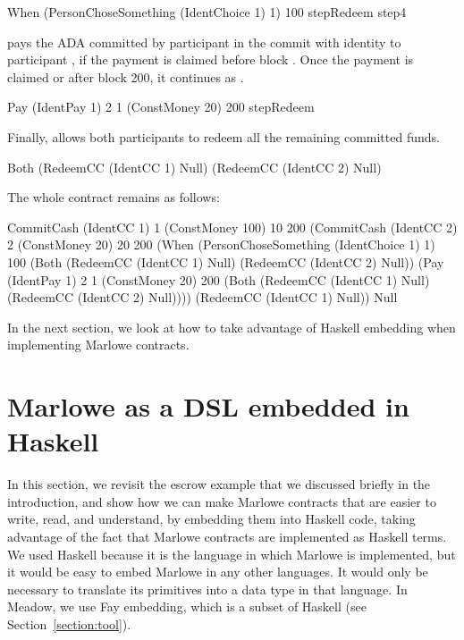 \documentclass[runningheads]{llncs}
\begin{document}
\begin{haskellcode}
When (PersonChoseSomething (IdentChoice 1) 1) 100
     stepRedeem
     step4
\end{haskellcode}

 pays the  ADA committed by participant  in the commit with 
identity  to participant , if the payment is claimed before block 
. Once the payment is claimed or after block 200, it continues as .

\begin{haskellcode}
Pay (IdentPay 1) 2 1 (ConstMoney 20) 200 stepRedeem
\end{haskellcode}

Finally,  allows both participants to redeem all the remaining committed funds.

\begin{haskellcode}
Both (RedeemCC (IdentCC 1) Null)
     (RedeemCC (IdentCC 2) Null)
\end{haskellcode}

The whole contract remains as follows:
\begin{haskellcode}
CommitCash (IdentCC 1) 1
           (ConstMoney 100)
           10 200
           (CommitCash (IdentCC 2) 2
                       (ConstMoney 20)
                       20 200
                       (When (PersonChoseSomething (IdentChoice 1) 1)
                             100
                             (Both (RedeemCC (IdentCC 1) Null)
                                   (RedeemCC (IdentCC 2) Null))
                             (Pay (IdentPay 1) 2 1
                                  (ConstMoney 20)
                                  200
                                  (Both (RedeemCC (IdentCC 1) Null)
                                        (RedeemCC (IdentCC 2) Null))))
                       (RedeemCC (IdentCC 1) Null))
           Null
\end{haskellcode}

In the next section, we look at how to take advantage of Haskell embedding when implementing Marlowe contracts.

\section{Marlowe as a DSL embedded in Haskell}
\label{section:example-escrow}

In this section, we revisit the escrow example that we discussed briefly in the introduction, and show how we can make 
Marlowe contracts that are easier to write, read, and understand, by embedding them into Haskell code, taking advantage 
of the fact that Marlowe contracts are implemented as Haskell terms. We used Haskell because it is the language in 
which Marlowe is implemented, but it would be easy to embed Marlowe in any other languages. It would only be necessary 
to translate its primitives into a data type in that language. In Meadow, we use Fay embedding, which is a subset of 
Haskell (see Section~\ref{section:tool}).
\end{document}
